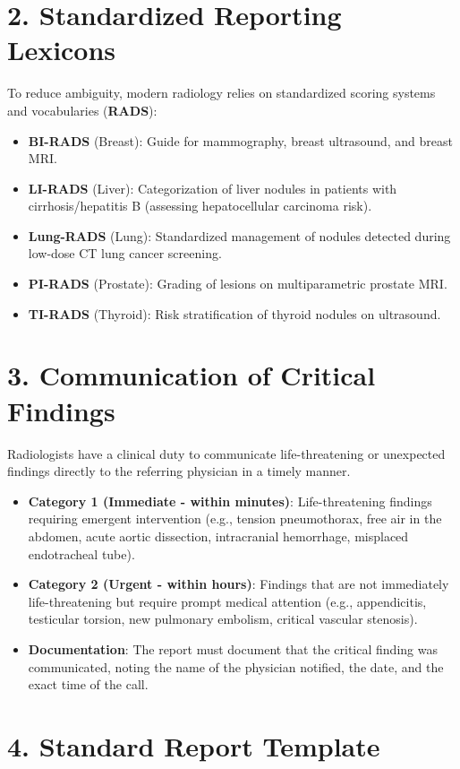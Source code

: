 \section*{2. Standardized Reporting Lexicons}
To reduce ambiguity, modern radiology relies on standardized scoring systems and vocabularies (\textbf{RADS}):
\begin{itemize}
    \item \textbf{BI-RADS} (Breast): Guide for mammography, breast ultrasound, and breast MRI.
    \item \textbf{LI-RADS} (Liver): Categorization of liver nodules in patients with cirrhosis/hepatitis B (assessing hepatocellular carcinoma risk).
    \item \textbf{Lung-RADS} (Lung): Standardized management of nodules detected during low-dose CT lung cancer screening.
    \item \textbf{PI-RADS} (Prostate): Grading of lesions on multiparametric prostate MRI.
    \item \textbf{TI-RADS} (Thyroid): Risk stratification of thyroid nodules on ultrasound.
\end{itemize}


\section*{3. Communication of Critical Findings}
Radiologists have a clinical duty to communicate life-threatening or unexpected findings directly to the referring physician in a timely manner.
\begin{itemize}
    \item \textbf{Category 1 (Immediate - within minutes)}: Life-threatening findings requiring emergent intervention (e.g., tension pneumothorax, free air in the abdomen, acute aortic dissection, intracranial hemorrhage, misplaced endotracheal tube).
    \item \textbf{Category 2 (Urgent - within hours)}: Findings that are not immediately life-threatening but require prompt medical attention (e.g., appendicitis, testicular torsion, new pulmonary embolism, critical vascular stenosis).
    \item \textbf{Documentation}: The report must document that the critical finding was communicated, noting the name of the physician notified, the date, and the exact time of the call.
\end{itemize}


\section*{4. Standard Report Template}

